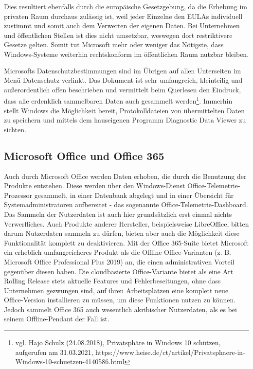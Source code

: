 Dies resultiert ebenfalls durch die europäische Gesetzgebung, da die Erhebung im privaten Raum durchaus zulässig ist, weil jeder Einzelne den EULAs individuell zustimmt und somit auch dem Verwerten der eigenen Daten. Bei Unternehmen und öffentlichen Stellen ist dies nicht umsetzbar, weswegen dort restriktivere Gesetze gelten. Somit tut Microsoft mehr oder weniger das Nötigste, dass Windows-Systeme weiterhin rechtskonform im öffentlichen Raum nutzbar bleiben.

Microsofts Datenschutzbestimmungen sind im Übrigen auf allen Unterseiten im Menü \glqq Datenschutz\grqq{} verlinkt. Das Dokument ist sehr umfangreich, kleinteilig und außerordentlich offen beschrieben und vermittelt beim Querlesen den Eindruck, dass alle erdenklich sammelbaren Daten auch gesammelt werden\footnote{vgl. Hajo Schulz (24.08.2018), Privatsphäre in Windows 10 schützen, aufgerufen am 31.03.2021, https://www.heise.de/ct/artikel/Privatsphaere-in-Windows-10-schuetzen-4140586.html}. Immerhin stellt Windows die Möglichkeit bereit, Protokolldateien von übermittelten Daten zu speichern und mittels dem hauseigenen Programm \glqq Diagnostic Data Viewer\grqq{} zu sichten.

\subsection{Microsoft Office und Office 365}
Auch durch Microsoft Office werden Daten erhoben, die durch die Benutzung der Produkte entstehen. Diese werden über den Windows-Dienst \glqq Office-Telemetrie-Prozessor\grqq{} gesammelt, in einer Datenbank abgelegt und in einer Übersicht für Systemadministratoren aufbereitet - das sogenannte \glqq Office-Telemetrie-Dashboard\grqq{}.\\
Das Sammeln der Nutzerdaten ist auch hier grundsätzlich erst einmal nichts Verwerfliches. Auch Produkte anderer Hersteller, beispielsweise LibreOffice, bitten darum Nutzerdaten sammeln zu dürfen, bieten aber auch die Möglichkeit diese Funktionalität komplett zu deaktivieren. Mit der \glqq Office 365\grqq{}-Suite bietet Microsoft ein erheblich umfangreicheres Produkt als die Offline-Office-Varianten (z. B. Microsoft Office Professional Plus 2019) an, die einen administrativen Vorteil gegenüber diesen haben. Die cloudbasierte Office-Variante bietet als eine Art \glqq Rolling Release\grqq{} stets aktuelle Features und Fehlerbeseitungen, ohne dass Unternehmen gezwungen sind, auf ihren Arbeitsplätzen eine komplett neue Office-Version installieren zu müssen, um diese Funktionen nutzen zu können. Jedoch sammelt Office 365 auch wesentlich akribischer Nutzerdaten, als es bei seinem Offline-Pendant der Fall ist.


